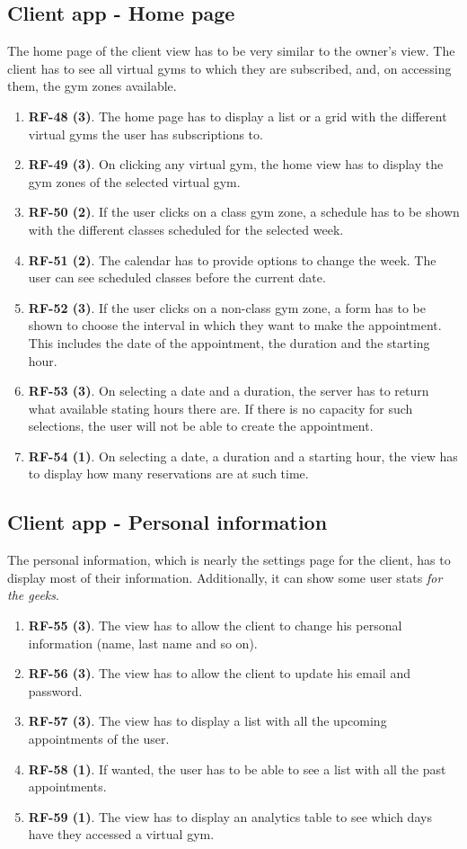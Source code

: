 \documentclass[a4paper, 12pt, oneside]{book}
\begin{document}
\subsection{Client app - Home page}
The home page of the client view has to be very similar to the owner's view. The client has to see all virtual gyms to which they are subscribed, and, on accessing them, the gym zones available.
\begin{enumerate}[label = -]
	\item \textbf{RF-48 (3)}. The home page has to display a list or a grid with the different virtual gyms the user has subscriptions to.
	\item \textbf{RF-49 (3)}. On clicking any virtual gym, the home view has to display the gym zones of the selected virtual gym.
	\item \textbf{RF-50 (2)}. If the user clicks on a class gym zone, a schedule has to be shown with the different classes scheduled for the selected week.
	\item \textbf{RF-51 (2)}. The calendar has to provide options to change the week. The user can see scheduled classes before the current date.
	\item \textbf{RF-52 (3)}. If the user clicks on a non-class gym zone, a form has to be shown to choose the interval in which they want to make the appointment. This includes the date of the appointment, the duration and the starting hour.
	\item \textbf{RF-53 (3)}. On selecting a date and a duration, the server has to return what available stating hours there are. If there is no capacity for such selections, the user will not be able to create the appointment.
	\item \textbf{RF-54 (1)}. On selecting a date, a duration and a starting hour, the view has to display how many reservations are at such time.
\end{enumerate}
\subsection{Client app - Personal information}
The personal information, which is nearly the settings page for the client, has to display most of their information. Additionally, it can show some user stats \emph{for the geeks}.
\begin{enumerate}[label = -]
	\item \textbf{RF-55 (3)}. The view has to allow the client to change his personal information (name, last name and so on).
	\item \textbf{RF-56 (3)}. The view has to allow the client to update his email and password.
	\item \textbf{RF-57 (3)}. The view has to display a list with all the upcoming appointments of the user.
	\item \textbf{RF-58 (1)}. If wanted, the user has to be able to see a list with all the past appointments.
	\item \textbf{RF-59 (1)}. The view has to display an analytics table to see which days have they accessed a virtual gym.
\end{enumerate}
\end{document}
